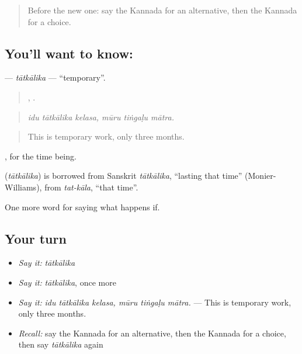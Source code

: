 \label{lesson:KA-C418-tatkalika}



\begin{quote}
Before the new one: say the Kannada for an alternative, then the Kannada for a choice.
\end{quote}

\subsection*{You'll want to know: }
\textbf{} — \emph{tātkālika} — \textquotedblleft{}temporary\textquotedblright{}.

\begin{quote}
  ,   .
\end{quote}

\begin{quote}
\emph{idu tātkālika kelasa, mūru tiṅgaḷu mātra.}
\end{quote}

\begin{quote}
This is temporary work, only three months.
\end{quote}

, for the time being.

\begin{cousinweb}
\textbf{} (\emph{tātkālika}) is borrowed from Sanskrit \emph{tātkālika}, \textquotedblleft{}lasting that time\textquotedblright{} (Monier-Williams), from \emph{tat-kāla}, \textquotedblleft{}that time\textquotedblright{}.
\end{cousinweb}

\begin{grammarlens}[title={What you've built}]
One more word for saying what happens if.
\end{grammarlens}

\subsection*{Your turn}
\begin{itemize}
\raggedright
  \item \emph{Say it:} \emph{tātkālika}
  \item \emph{Say it:} \emph{tātkālika}, once more
  \item \emph{Say it:} \emph{idu tātkālika kelasa, mūru tiṅgaḷu mātra.} — This is temporary work, only three months.
  \item \emph{Recall:} say the Kannada for an alternative, then the Kannada for a choice, then say \emph{tātkālika} again
\end{itemize}

